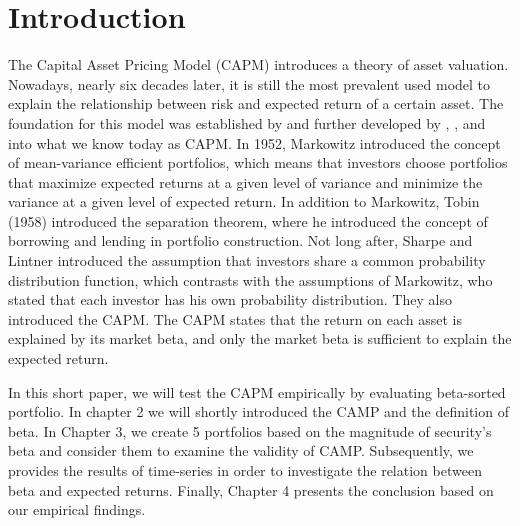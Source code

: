 \documentclass[12pt,a4paper]{article}
\begin{document}
\section{Introduction}
The Capital Asset Pricing Model (CAPM) introduces a theory of asset valuation. Nowadays, nearly six decades later, it is still the most prevalent used model to explain the relationship between risk and expected return of a certain asset. The foundation for this model was established by  and further developed by , , and  into what we know today as CAPM. In 1952, Markowitz introduced the concept of mean-variance efficient portfolios, which means that investors choose portfolios that maximize expected returns at a given level of variance and minimize the variance at a given level of expected return. In addition to Markowitz, Tobin (1958) introduced the separation theorem, where he introduced the concept of borrowing and lending in portfolio construction. Not long after, Sharpe and Lintner introduced the assumption that investors share a common probability distribution function, which contrasts with the assumptions of Markowitz, who stated that each investor has his own probability distribution. They also introduced the CAPM. The CAPM states that the return on each asset is explained by its market beta, and only the market beta is sufficient to explain the expected return.

In this short paper, we will test the CAPM empirically by evaluating beta-sorted portfolio. In chapter 2 we will shortly introduced the CAMP and the definition of beta. In Chapter 3, we create 5 portfolios based on the magnitude of security's beta and consider them to examine the validity of CAMP. Subsequently, we provides the results of time-series in order to investigate the relation between beta and expected returns. Finally, Chapter 4 presents the conclusion based on our empirical findings.
\end{document}
